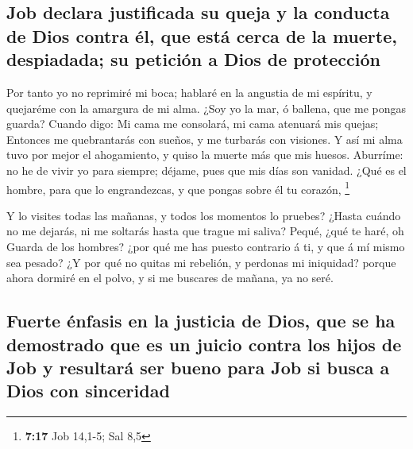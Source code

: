 \hypertarget{job-declara-justificada-su-queja-y-la-conducta-de-dios-contra-uxe9l-que-estuxe1-cerca-de-la-muerte-despiadada-su-peticiuxf3n-a-dios-de-protecciuxf3n}{%
\subsection{Job declara justificada su queja y la conducta de Dios
contra él, que está cerca de la muerte, despiadada; su petición a Dios
de
protección}\label{job-declara-justificada-su-queja-y-la-conducta-de-dios-contra-uxe9l-que-estuxe1-cerca-de-la-muerte-despiadada-su-peticiuxf3n-a-dios-de-protecciuxf3n}}

 Por tanto yo no reprimiré mi boca; hablaré en la angustia
de mi espíritu, y quejaréme con la amargura de mi alma. 
¿Soy yo la mar, ó ballena, que me pongas guarda?  Cuando
digo: Mi cama me consolará, mi cama atenuará mis quejas; 
Entonces me quebrantarás con sueños, y me turbarás con visiones.
 Y así mi alma tuvo por mejor el ahogamiento, y quiso la
muerte más que mis huesos.  Aburríme: no he de vivir yo
para siempre; déjame, pues que mis días son vanidad.  ¿Qué
es el hombre, para que lo engrandezcas, y que pongas sobre él tu
corazón, \footnote{\textbf{7:17} Job 14,1-5; Sal 8,5}

 Y lo visites todas las mañanas, y todos los momentos lo
pruebes?  ¿Hasta cuándo no me dejarás, ni me soltarás hasta
que trague mi saliva?  Pequé, ¿qué te haré, oh Guarda de
los hombres? ¿por qué me has puesto contrario á ti, y que á mí mismo sea
pesado?  ¿Y por qué no quitas mi rebelión, y perdonas mi
iniquidad? porque ahora dormiré en el polvo, y si me buscares de mañana,
ya no seré.

\hypertarget{fuerte-uxe9nfasis-en-la-justicia-de-dios-que-se-ha-demostrado-que-es-un-juicio-contra-los-hijos-de-job-y-resultaruxe1-ser-bueno-para-job-si-busca-a-dios-con-sinceridad}{%
\subsection{Fuerte énfasis en la justicia de Dios, que se ha demostrado
que es un juicio contra los hijos de Job y resultará ser bueno para Job
si busca a Dios con
sinceridad}\label{fuerte-uxe9nfasis-en-la-justicia-de-dios-que-se-ha-demostrado-que-es-un-juicio-contra-los-hijos-de-job-y-resultaruxe1-ser-bueno-para-job-si-busca-a-dios-con-sinceridad}}

